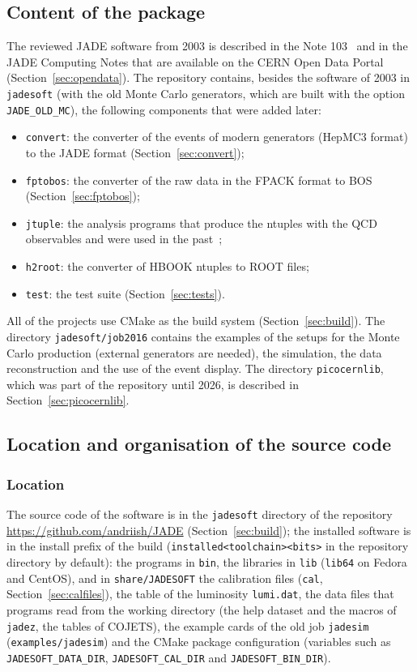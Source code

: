 \subsection{Content of the package}
The reviewed JADE software from 2003 is described in the Note 103~\cite{JCN:103} and in the JADE Computing Notes that are available on the CERN Open Data Portal (Section~\ref{sec:opendata}).
The repository contains, besides the software of 2003 in \texttt{jadesoft} (with the old Monte Carlo generators, which are built with the option \texttt{JADE\_\allowbreak{}OLD\_\allowbreak{}MC}),
the following components that were added later:
\begin{itemize}
\item \texttt{convert}: the converter of the events of modern generators (HepMC3 format) to the JADE format (Section~\ref{sec:convert});
\item \texttt{fptobos}: the converter of the raw data in the FPACK format to BOS (Section~\ref{sec:fptobos});
\item \texttt{jtuple}: the analysis programs that produce the ntuples with the QCD observables and were used in the past~\cite{Schieck:2012mp};
\item \texttt{h2root}: the converter of HBOOK ntuples to ROOT files;
\item \texttt{test}: the test suite (Section~\ref{sec:tests}).
\end{itemize}
All of the projects use CMake as the build system (Section~\ref{sec:build}). The directory \texttt{jadesoft/\allowbreak{}job2016} contains the examples of the setups for the
Monte Carlo production (external generators are needed), the simulation, the data reconstruction and the use of the event display.
The directory \texttt{picocernlib}, which was part of the repository until 2026, is described in Section~\ref{sec:picocernlib}.

\subsection{Location and organisation of the source code}
\subsubsection{Location}
The source code of the software is in the \texttt{jadesoft} directory of the repository
\url{https://github.com/andriish/JADE} (Section~\ref{sec:build}); the installed software is in the install
prefix of the build (\texttt{installed<toolchain><bits>} in the repository directory by default): the programs in
\texttt{bin}, the libraries in \texttt{lib} (\texttt{lib64} on Fedora and CentOS), and in \texttt{share/\allowbreak{}JADESOFT} the
calibration files (\texttt{cal}, Section~\ref{sec:calfiles}), the table of the luminosity \texttt{lumi.dat}, the data files that programs read from the working directory
(the help dataset and the macros of \texttt{jadez}, the tables of COJETS), the example cards of the old job \texttt{jadesim} (\texttt{examples/\allowbreak{}jadesim}) and the CMake
package configuration (variables such as \texttt{JADESOFT\_DATA\_DIR}, \texttt{JADESOFT\_CAL\_DIR} and \texttt{JADESOFT\_BIN\_DIR}).
